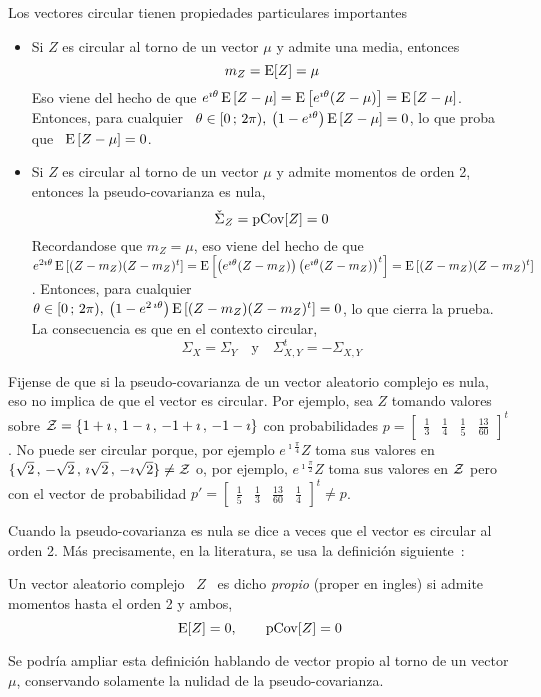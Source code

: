 Los vectores circular tienen propiedades particulares importantes
%
\begin{itemize}
\item  Si $Z$  es circular  al torno  de  un vector  $\mu$ y  admite una  media,
  entonces $$m_Z = \operatorname{E}[Z] = \mu$$ Eso viene del hecho de que $e^{\imath \theta}
  \operatorname{E}\left[ Z - \mu \right] =  \operatorname{E}\left[ e^{\imath \theta} (Z - \mu) \right] =
  \operatorname{E}\left[ Z  - \mu \right]$. Entonces, para  cualquier \ $\theta \in  [0 \, ; \, 2
  \pi), \: \left(1 - e^{\imath \theta}  \right) \operatorname{E}\left[ Z - \mu \right] = 0$,
  lo que proba que \ $\operatorname{E}\left[ Z - \mu \right] = 0$.
%
\item Si $Z$ es circular al torno  de un vector $\mu$ y admite momentos de orden
  2, entonces la pseudo-covarianza es  nula, $$\check{\Sigma}_Z = \operatorname{pCov}[Z] = 0$$
  Recordandose que $m_Z = \mu$, eso  viene del hecho de que $e^{2 \imath \theta}
  \operatorname{E}\left[ (Z - m_Z) (Z - m_Z)^t \right] = \operatorname{E}\left[ \left( e^{\imath \theta}
      (Z - m_Z)  \right) \left( e^{\imath \theta} (Z -  m_Z) \right)^t \right] =
  \operatorname{E}\left[ (Z - m_Z) (Z - m_Z)^t \right]$.  Entonces, para cualquier \ $\theta
  \in [0 \, ; \, 2 \pi), \: \left(1  - e^{2 \, \imath \theta} \right) \operatorname{E}\left[ (Z -
    m_Z) (Z - m_Z)^t  \right] = 0$, lo que cierra la  prueba. La consecuencia es
  que en el contexto circular,
  \[
  \Sigma_X = \Sigma_Y \quad \mbox{y} \quad \Sigma_{X,Y}^t = - \Sigma_{X,Y}
  \]
\end{itemize}

Fijense de que si la pseudo-covarianza  de un vector aleatorio complejo es nula,
eso  no implica de  que el  vector es  circular.  Por  ejemplo, sea  $Z$ tomando
valores sobre  $\mathcal{Z} =  \{ 1+\imath \,  , \, 1-\imath  \, ,  \, -1+\imath \,  , \,
-1-\imath  \}$ con  probabilidades  $p  = \begin{bmatrix}  \frac13  & \frac14  &
  \frac15 &  \frac{13}{60} \end{bmatrix}^t$. No  puede ser circular  porque, por
ejemplo $e^{\imath  \frac{\pi}{4}} Z$  toma sus  valores en $\{  \sqrt2 \,  , \,
-\sqrt2 \, , \, \imath \sqrt2 \, ,  \, -\imath \sqrt2 \} \ne \mathcal{Z}$ o, por ejemplo,
$e^{\imath \frac{\pi}{2}}  Z$ toma  sus valores  en $\mathcal{Z}$ pero  con el  vector de
probabilidad  $p'  =  \begin{bmatrix}   \frac15  &  \frac13  &  \frac{13}{60}  &
  \frac14\end{bmatrix}^t \ne p$.

Cuando la pseudo-covarianza es nula se dice a veces que el vector es circular al
orden  2.  M\'as  precisamente,  en   la  literatura,  se  usa  la  definici\'on
siguiente~\cite[Def.~17.4.1]{Lap17}:
%
\begin{definicion}\label{Def:MP:VectorAleatorioComplejoPropio}
%
  Un vector aleatorio complejo \ $Z$  \ es dicho {\em propio} (proper en ingles)
  si admite momentos hasta el orden 2 y ambos,
  \[
  \operatorname{E}[Z] = 0, \qquad \operatorname{pCov}[Z] = 0
  \]
\end{definicion}
%
Se podr\'ia ampliar  esta definici\'on hablando de vector propio  al torno de un
vector $\mu$, conservando solamente la nulidad de la pseudo-covarianza.

